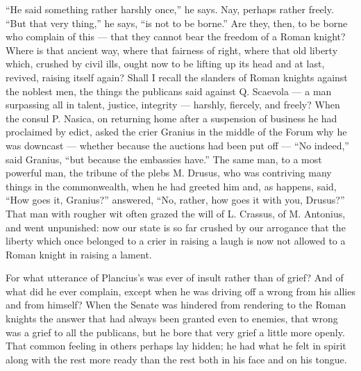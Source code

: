  ``He said something rather harshly once,'' he says. Nay, perhaps rather freely. ``But that very thing,'' he says, ``is not to be borne.'' Are they, then, to be borne who complain of this --- that they cannot bear the freedom of a Roman knight? Where is that ancient way, where that fairness of right, where that old liberty which, crushed by civil ills, ought now to be lifting up its head and at last, revived, raising itself again? Shall I recall the slanders of Roman knights against the noblest men, the things the publicans said against Q. Scaevola --- a man surpassing all in talent, justice, integrity --- harshly, fiercely, and freely? When the consul P. Nasica, on returning home after a suspension of business he had proclaimed by edict, asked the crier Granius in the middle of the Forum why he was downcast --- whether because the auctions had been put off --- ``No indeed,'' said Granius, ``but because the embassies have.'' The same man, to a most powerful man, the tribune of the plebs M. Drusus, who was contriving many things in the commonwealth, when he had greeted him and, as happens, said, ``How goes it, Granius?'' answered, ``No, rather, how goes it with you, Drusus?'' That man with rougher wit often grazed the will of L. Crassus, of M. Antonius, and went unpunished: now our state is so far crushed by our arrogance that the liberty which once belonged to a crier in raising a laugh is now not allowed to a Roman knight in raising a lament.

 For what utterance of Plancius's was ever of insult rather than of grief? And of what did he ever complain, except when he was driving off a wrong from his allies and from himself? When the Senate was hindered from rendering to the Roman knights the answer that had always been granted even to enemies, that wrong was a grief to all the publicans, but he bore that very grief a little more openly. That common feeling in others perhaps lay hidden; he had what he felt in spirit along with the rest more ready than the rest both in his face and on his tongue.

